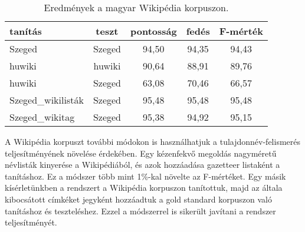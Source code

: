 \documentclass{llncs}
\begin{document}

\begin{table}[ht]
\begin{center}
\begin{tabular}{lcccc}
\toprule 
\bf tanítás & \bf teszt & \bf pontosság & \bf fedés & \bf F-mérték \\ 
\midrule
Szeged & Szeged & 94,50 & 94,35 & 94,43 \\
huwiki & huwiki & 90,64 & 88,91 &  89,76  \\
huwiki & Szeged & 63,08 & 70,46 & 66,57  \\
Szeged\_wikilisták & Szeged & 95,48 & 95,48 & 95,48  \\
Szeged\_wikitag & Szeged & 95,38 & 94,92 & 95,15 \\
\bottomrule
\end{tabular}
\end{center}
\caption{Eredmények a magyar Wikipédia korpuszon.}
\label{tab:huresults}
\end{table}

A Wikipédia korpuszt további módokon is használhatjuk a tulajdonnév-felismerés teljesítményének növelése érdekében. Egy kézenfekvő megoldás nagyméretű névlisták kinyerése a Wikipédiából, és azok hozzáadása gazetteer listaként a tanításhoz. Ez a módszer több mint 1\%-kal növelte az F-mértéket. Egy másik kísérletünkben a rendszert a Wikipédia korpuszon tanítottuk, majd az általa kibocsátott címkéket jegyként hozzáadtuk a gold standard korpuszon való tanításhoz és teszteléshez. Ezzel a módszerrel is sikerült javítani a rendszer teljesítményét. 
\end{document}
